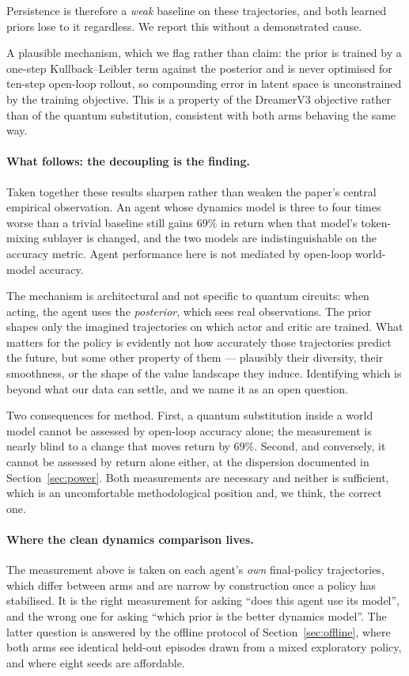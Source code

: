 \documentclass[11pt,onecolumn]{article}
\begin{document}
Persistence is therefore a \emph{weak} baseline on these trajectories,
and both learned priors lose to it regardless. We report this without a
demonstrated cause.

A plausible mechanism, which we flag rather than claim: the prior is
trained by a one-step Kullback--Leibler term against the posterior and
is never optimised for ten-step open-loop rollout, so compounding error
in latent space is unconstrained by the training objective. This is a
property of the DreamerV3 objective rather than of the quantum
substitution, consistent with both arms behaving the same way.

\paragraph{What follows: the decoupling is the finding.}
Taken together these results sharpen rather than weaken the paper's
central empirical observation. An agent whose dynamics model is
three to four times worse than a trivial baseline still gains $69\%$ in
return when that model's token-mixing sublayer is changed, and the two
models are indistinguishable on the accuracy metric. Agent performance
here is not mediated by open-loop world-model accuracy.

The mechanism is architectural and not specific to quantum circuits:
when acting, the agent uses the \emph{posterior}, which sees real
observations. The prior shapes only the imagined trajectories on which
actor and critic are trained. What matters for the policy is evidently
not how accurately those trajectories predict the future, but some
other property of them --- plausibly their diversity, their smoothness,
or the shape of the value landscape they induce. Identifying which is
beyond what our data can settle, and we name it as an open question.

Two consequences for method. First, a quantum substitution inside a
world model cannot be assessed by open-loop accuracy alone; the
measurement is nearly blind to a change that moves return by $69\%$.
Second, and conversely, it cannot be assessed by return alone either,
at the dispersion documented in Section~\ref{sec:power}. Both
measurements are necessary and neither is sufficient, which is an
uncomfortable methodological position and, we think, the correct one.

\paragraph{Where the clean dynamics comparison lives.}
The measurement above is taken on each agent's \emph{own} final-policy
trajectories, which differ between arms and are narrow by construction
once a policy has stabilised. It is the right measurement for asking
``does this agent use its model'', and the wrong one for asking ``which
prior is the better dynamics model''. The latter question is answered
by the offline protocol of Section~\ref{sec:offline}, where both arms
see identical held-out episodes drawn from a mixed exploratory policy,
and where eight seeds are affordable.
\end{document}
